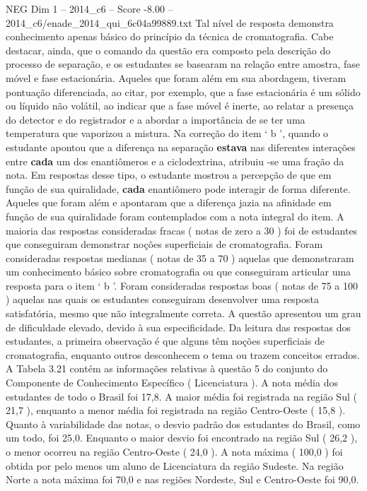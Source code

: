 \begin{textsample}{NEG Dim 1 – 2014\_c6 – Score -8.00 – 2014\_c6/enade\_2014\_qui\_6c04a99889.txt}
Tal nível de resposta demonstra conhecimento apenas básico do princípio da técnica de cromatografia.
Cabe destacar, ainda, que o comando da questão era composto pela descrição do processo de separação, e os estudantes se basearam na relação entre amostra, fase móvel e fase estacionária.
Aqueles que foram além em sua abordagem, tiveram pontuação diferenciada, ao citar, por exemplo, que a fase estacionária é um sólido ou líquido não volátil, ao indicar que a fase móvel é inerte, ao relatar a presença do detector e do registrador e a abordar a importância de se ter uma temperatura que vaporizou a mistura.
Na correção do item ‘ b ’, quando o estudante apontou que a diferença na separação \textbf{estava} nas diferentes interações entre \textbf{cada} um dos enantiômeros e a ciclodextrina, atribuiu -se uma fração da nota.
Em respostas desse tipo, o estudante mostrou a percepção de que em função de sua quiralidade, \textbf{cada} enantiômero pode interagir de forma diferente.
Aqueles que foram além e apontaram que a diferença jazia na afinidade em função de sua quiralidade foram contemplados com a nota integral do item.
A maioria das respostas consideradas fracas ( notas de zero a 30 ) foi de estudantes que conseguiram demonstrar noções superficiais de cromatografia.
Foram consideradas respostas medianas ( notas de 35 a 70 ) aquelas que demonstraram um conhecimento básico sobre cromatografia ou que conseguiram articular uma resposta para o item ‘ b ’.
Foram consideradas respostas boas ( notas de 75 a 100 ) aquelas nas quais os estudantes conseguiram desenvolver uma resposta satisfatória, mesmo que não integralmente correta.
A questão apresentou um grau de dificuldade elevado, devido à sua especificidade.
Da leitura das respostas dos estudantes, a primeira observação é que alguns têm noções superficiais de cromatografia, enquanto outros desconhecem o tema ou trazem conceitos errados.
A Tabela 3.21 contém as informações relativas à questão 5 do conjunto do Componente de Conhecimento Específico ( Licenciatura ).
A nota média dos estudantes de todo o Brasil foi 17,8.
A maior média foi registrada na região Sul ( 21,7 ), enquanto a menor média foi registrada na região Centro-Oeste ( 15,8 ).
Quanto à variabilidade das notas, o desvio padrão dos estudantes do Brasil, como um todo, foi 25,0.
Enquanto o maior desvio foi encontrado na região Sul ( 26,2 ), o menor ocorreu na região Centro-Oeste ( 24,0 ).
A nota máxima ( 100,0 ) foi obtida por pelo menos um aluno de Licenciatura da região Sudeste.
Na região Norte a nota máxima foi 70,0 e nas regiões Nordeste, Sul e Centro-Oeste foi 90,0.

\end{textsample}
